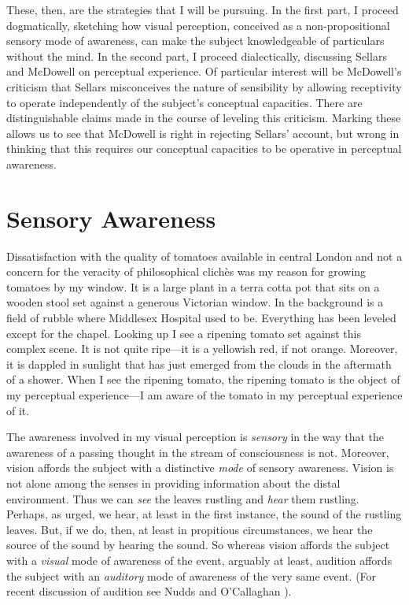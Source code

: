 \documentclass[12pt]{article}
\begin{document}
These, then, are the strategies that I will be pursuing. In the first part, I proceed dogmatically, sketching how visual perception, conceived as a non-propositional sensory mode of awareness, can make the subject knowledgeable of particulars without the mind. In the second part, I proceed dialectically, discussing Sellars and McDowell on perceptual experience. Of particular interest will be McDowell's criticism that Sellars misconceives the nature of sensibility by allowing receptivity to operate independently of the subject's conceptual capacities. There are distinguishable claims made in the course of leveling this criticism. Marking these allows us to see that McDowell is right in rejecting Sellars' account, but wrong in thinking that this requires our conceptual capacities to be operative in perceptual awareness.


\section{Sensory Awareness} %
\label{sec:sensory_awareness}

Dissatisfaction with the quality of tomatoes available in central London and not a concern for the veracity of philosophical clichès was my reason for growing tomatoes by my window. It is a large plant in a terra cotta pot that sits on a wooden stool set against a generous Victorian window. In the background is a field of rubble where Middlesex Hospital used to be. Everything has been leveled except for the chapel. Looking up I see a ripening tomato set against this complex scene. It is not quite ripe---it is a yellowish red, if not orange. Moreover, it is dappled in sunlight that has just emerged from the clouds in the aftermath of a shower. When I see the ripening tomato, the ripening tomato is the object of my perceptual experience---I am aware of the tomato in my perceptual experience of it. 

The awareness involved in my visual perception is \emph{sensory} in the way that the awareness of a passing thought in the stream of consciousness is not. Moreover, vision affords the subject with a distinctive \emph{mode} of sensory awareness. Vision is not alone among the senses in providing information about the distal environment. Thus we can \emph{see} the leaves rustling and \emph{hear} them rustling. Perhaps, as \citet[]{Berkeley:1734fk} urged, we hear, at least in the first instance, the sound of the rustling leaves. But, if we do, then, at least in propitious circumstances, we hear the source of the sound by hearing the sound. So whereas vision affords the subject with a \emph{visual} mode of awareness of the event, arguably at least, audition affords the subject with an \emph{auditory} mode of awareness of the very same event. (For recent discussion of audition see Nudds and O'Callaghan \citeyear{Nudds:2009sk}).
\end{document}
